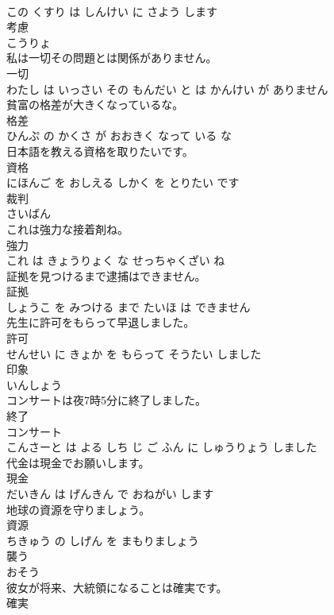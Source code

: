 \documentclass[8pt]{extreport}
\begin{document}
\begin{CJK}{UTF8}{min}
\\	この くすり は しんけい に さよう します		
\\	考慮	
\\	こうりょ		
\\	私は一切その問題とは関係がありません。	
\\	一切 
\\	わたし は いっさい その もんだい と は かんけい が ありません		
\\	貧富の格差が大きくなっているな。	
\\	格差 
\\	ひんぷ の かくさ が おおきく なって いる な		
\\	日本語を教える資格を取りたいです。	
\\	資格 
\\	にほんご を おしえる しかく を とりたい です		
\\	裁判	
\\	さいばん		
\\	これは強力な接着剤ね。	
\\	強力 
\\	これ は きょうりょく な せっちゃくざい ね		
\\	証拠を見つけるまで逮捕はできません。	
\\	証拠 
\\	しょうこ を みつける まで たいほ は できません		
\\	先生に許可をもらって早退しました。	
\\	許可 
\\	せんせい に きょか を もらって そうたい しました		
\\	印象	
\\	いんしょう		
\\	コンサートは夜7時5分に終了しました。	
\\	終了 
\\	コンサート 
\\	こんさーと は よる しち じ ご ふん に しゅうりょう しました		
\\	代金は現金でお願いします。	
\\	現金 
\\	だいきん は げんきん で おねがい します		
\\	地球の資源を守りましょう。	
\\	資源 
\\	ちきゅう の しげん を まもりましょう		
\\	襲う	
\\	おそう		
\\	彼女が将来、大統領になることは確実です。	
\\	確実 

\end{CJK}
\end{document}
